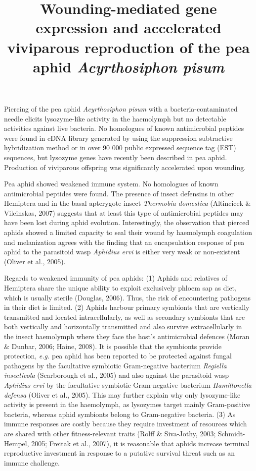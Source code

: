 \documentclass[11pt]{article}
\title{Wounding-mediated gene expression and accelerated viviparous reproduction of the pea aphid \textit{Acyrthosiphon pisum}}
\author{}
\date{}
\begin{document}
  \maketitle

  \linenumbers
Piercing of the pea aphid \textit{Acyrthosiphon pisum} with a bacteria-contaminated needle elicits lysozyme-like activity in the haemolymph but no detectable activities against live bacteria. 
No homologues of known antimicrobial peptides were found in cDNA library generated by using the suppression subtractive hybridization method or in over 90 000 public expressed sequence tag (EST) sequences, but lysozyme genes have recently been described in pea aphid. 
Production of viviparous offspring was significantly accelerated upon wounding.

\newline

Pea aphid showed weakened immune system. 
No homologues of known antimicrobial peptides were found. 
The presence of insect defensins in other Hemiptera and in the basal apterygote insect \textit{Thermobia domestica} (Altincicek & Vilcinskas, 2007) suggests that at least this type of antimicrobial peptides may have been lost during aphid evolution. 
Interestingly, the observation that pierced aphids showed a limited capacity to seal their wound by haemolymph coagulation and melanization agrees with the finding that an encapsulation response of pea aphid to the parasitoid wasp \textit{Aphidius ervi} is either very weak or non-existent (Oliver et al., 2005).

\newline

Regards to weakened immunity of pea aphids: 
(1) Aphids and relatives of Hemiptera share the unique ability to exploit exclusively phloem sap as diet, which is usually sterile (Douglas, 2006). Thus, the risk of encountering pathogens in their diet is limited. 
(2) Aphids harbour primary symbionts that are vertically transmitted and located intracellularly, as well as secondary symbionts that are both vertically and horizontally transmitted and also survive extracellularly in the insect haemolymph where they face the host's antimicrobial defences (Moran & Dunbar, 2006; Haine, 2008). 
It is possible that the symbionts provide protection, \textit{e.g.} pea aphid has been reported to be protected against fungal pathogens by the facultative symbiotic Gram-negative bacterium \textit{Regiella insecticola} (Scarborough et al., 2005) and also against the parasitoid wasp \textit{Aphidius ervi} by the facultative symbiotic Gram-negative bacterium \textit{Hamiltonella defensa} (Oliver et al., 2005). 
This may further explain why only lysozyme-like activity is present in the haemolymph, as lysozymes target mainly Gram-positive bacteria, whereas aphid symbionts belong to Gram-negative bacteria. 
(3) As immune responses are costly because they require investment of resources which are shared with other fitness-relevant traits (Rolff & Siva-Jothy, 2003; Schmidt-Hempel, 2005; Freitak et al., 2007), it is reasonable that aphids increase terminal reproductive investment in response to a putative survival threat such as an immune challenge. 
\end{document}
